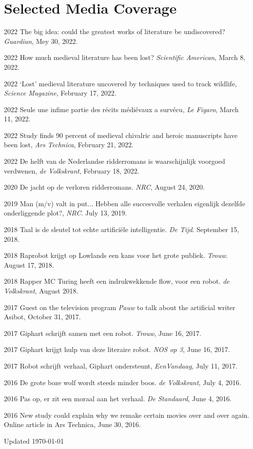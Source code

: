 \documentclass[12pt,letterpaper]{report}
\begin{document}
\section*{Selected Media Coverage}
\begin{tablist}
\item[2022] \tab{}The big idea: could the greatest works of literature be undiscovered?
  \textit{Guardian}, Mey 30, 2022.
\item[2022] \tab{}How much medieval literature has been lost? \textit{Scientific
    American}, March 8, 2022.
\item[2022] \tab{}`Lost' medieval literature uncovered by techniques used to track
  wildlife, \textit{Science Magazine}, February 17, 2022.
\item[2022] \tab{}Seule une infime partie des récits médiévaux a survécu, \textit{Le
    Figaro}, March 11, 2022.
\item[2022] \tab{}Study finds 90 percent of medieval chivalric and heroic manuscripts have
  been lost, \textit{Ars Technica}, February 21, 2022.
\item[2022] \tab{}De helft van de Nederlandse ridderromans is waarschijnlijk voorgoed
  verdwenen, \textit{de Volkskrant}, February 18, 2022.
\item[2020] \tab{}De jacht op de verloren ridderromans. \textit{NRC}, August 24, 2020.
\item[2019] \tab{}Man (m/v) valt in put... Hebben alle succesvolle verhalen eigenlijk
  dezelfde onderliggende plot?, \textit{NRC}. July 13, 2019. 
\item[2018] \tab{}Taal is de sleutel tot echte artificiële intelligentie. \textit{De Tijd}.
  September 15, 2018.
\item[2018] \tab{}Raprobot krijgt op Lowlands een kans voor het grote publiek. \textit{Trouw}.
  August 17, 2018. 
\item[2018] \tab{}Rapper MC Turing heeft een indrukwekkende flow, voor een robot. \textit{de
    Volkskrant}, August 2018. 
\item[2017] \tab{}Guest on the television program \textit{Pauw} to talk about the artificial
  writer Asibot, October 31, 2017.
\item[2017] \tab{}Giphart schrijft samen met een robot. \textit{Trouw}, June 16, 2017. 
\item[2017] \tab{}Giphart krijgt hulp van deze literaire robot. \textit{NOS op 3}, June 16, 2017. 
\item[2017] \tab{}Robot schrijft verhaal, Giphart ondersteunt, \textit{EenVandaag}, July
  11, 2017.
\item[2016] \tab{}De grote boze wolf wordt steeds minder boos. \textit{de Volkskrant},
  July 4, 2016. 
\item[2016] \tab{}Pas op, er zit een moraal aan het verhaal. \textit{De Standaard}, June
  4, 2016. 
\item[2016] \tab{}New study could explain why we remake certain movies over and over
  again. Online article in Ars Technica, June 30, 2016.
\end{tablist}
  

\begin{center}
  \vfill
Updated \monthyeardate\today
\end{center}
\end{document}
